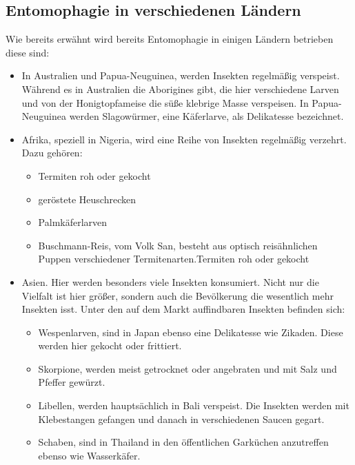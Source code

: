 \subsection{Entomophagie in verschiedenen Ländern}
Wie bereits erwähnt wird bereits Entomophagie in einigen Ländern betrieben diese sind: 
\begin{itemize}
\item In Australien und Papua-Neuguinea, werden Insekten regelmäßig verspeist.
Während es in Australien die Aborigines gibt, die hier verschiedene
Larven und von der Honigtopfameise die süße klebrige Masse verspeisen.
In Papua-Neuguinea werden Slagowürmer, eine Käferlarve, als
Delikatesse bezeichnet.
\item Afrika, speziell in Nigeria, wird eine Reihe von Insekten regelmäßig verzehrt.
Dazu gehören:
\begin{itemize}
	\item Termiten roh oder gekocht
	\item geröstete Heuschrecken
	\item Palmkäferlarven
	\item Buschmann-Reis, vom Volk San, besteht aus optisch reisähnlichen Puppen verschiedener Termitenarten.Termiten roh oder gekocht
\end{itemize}
\item  Asien. Hier werden besonders viele Insekten konsumiert. Nicht nur die
Vielfalt ist hier größer, sondern auch die Bevölkerung die wesentlich mehr Insekten isst. Unter den auf dem Markt auffindbaren Insekten befinden sich:

\begin{itemize}
	\item Wespenlarven, sind in Japan ebenso eine Delikatesse wie Zikaden. Diese werden hier gekocht oder frittiert.
	\item Skorpione, werden meist getrocknet oder angebraten und mit Salz und Pfeffer gewürzt.
	\item Libellen, werden hauptsächlich in Bali verspeist. Die Insekten werden mit Klebestangen gefangen und danach in verschiedenen Saucen gegart.
	\item Schaben, sind in Thailand in den öffentlichen Garküchen anzutreffen ebenso wie Wasserkäfer.


\end{itemize}
\end{itemize}
